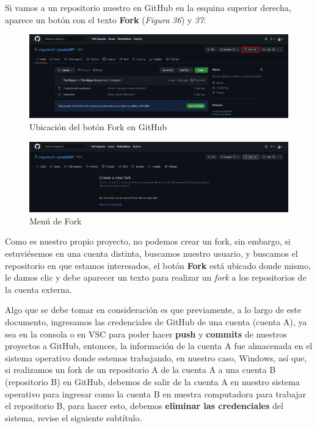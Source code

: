 Si vamos a un repositorio nuestro en GitHub en la esquina superior derecha, aparece un botón con el texto \textbf{Fork} (\textit{Figura 36}) y \textit{37}:
\begin{figure}[H]
    \begin{center}
        \caption{Ubicación del botón Fork en GitHub}
        \label{fig: 36}
        \includegraphics[width=14cm]{capturas/fork2.png}
    \end{center}
\end{figure}
\begin{figure}[H]
    \begin{center}
        \caption{Menú de Fork}
        \label{fig: 37}
        \includegraphics[width=14cm]{capturas/fork3.png}
    \end{center}
\end{figure}

Como es nuestro propio proyecto, no podemos crear un fork, sin embargo, si estuviésemos en una cuenta distinta, buscamos nuestro usuario, y buscamos el repositorio en que estamos interesados, el botón \textbf{Fork} está ubicado donde mismo, le damos clic y debe aparecer un texto para realizar un \textit{fork} a los repositorios de la cuenta externa.

Algo que se debe tomar en consideración es que previamente, a lo largo de este documento, ingresamos las credenciales de GitHub de una cuenta (cuenta A), ya sea en la consola o en VSC para poder hacer \textbf{push} y \textbf{commits} de nuestros proyectos a GitHub, entonces, la información de la cuenta A fue almacenada en el sistema operativo donde estemos trabajando, en nuestro caso, Windows, así que, si realizamos un fork de un repositorio A de la cuenta A a una cuenta B (repositorio B) en GitHub, debemos de salir de la cuenta A en nuestro sistema operativo para ingresar como la cuenta B en nuestra computadora para trabajar el repositorio B, para hacer esto, debemos \textbf{eliminar las credenciales} del sistema, revise el siguiente subtítulo.



